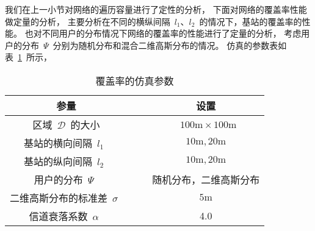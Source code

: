 我们在上一小节对网络的遍历容量进行了定性的分析，
下面对网络的覆盖率性能做定量的分析，
主要分析在不同的横纵间隔~$l_1$、$l_2$~的情况下，基站的覆盖率的性能。
也对不同用户的分布情况下网络的覆盖率的性能进行了定量的分析，
考虑用户的分布~$\Psi$~分别为随机分布和混合二维高斯分布的情况。
仿真的参数表如表~\ref{square_grid_pc_sim_para}~所示，
\begin{table}[htbp]
\caption{覆盖率的仿真参数}
\label{square_grid_pc_sim_para}
\vspace{0.5em}\centering\wuhao
\begin{tabular}{cccc}
\toprule[1.5pt]
参量 & & & 设置 \\
\midrule[0.5pt]
区域~$\mathcal{D}$~的大小  & & & ~$100\mathrm{m} \times 100 \mathrm{m}$ \\
基站的横向间隔~$l_1$~ & & &  $10\mathrm{m} , 20\mathrm{m}$ \\
基站的纵向间隔~$l_2$~ & & &  $10\mathrm{m} , 20\mathrm{m}$ \\
用户的分布~$\Psi$~ & & & 随机分布，二维高斯分布\\
二维高斯分布的标准差~$\sigma$~ & & & ${5\mathrm{m}}$\\
信道衰落系数~$\alpha$~  & & & 4.0\\
\bottomrule[1.5pt]
\end{tabular}
\end{table}

